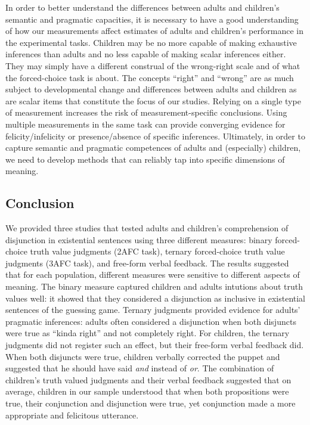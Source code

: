 \documentclass[floatsintext,man]{apa6}
\theoremstyle{definition}
\theoremstyle{definition}
\theoremstyle{definition}
\theoremstyle{remark}
\begin{document}
In order to better understand the differences between adults and
children's semantic and pragmatic capacities, it is necessary to have a
good understanding of how our measurements affect estimates of adults
and children's performance in the experimental tasks. Children may be no
more capable of making exhaustive inferences than adults and no less
capable of making scalar inferences either. They may simply have a
different construal of the wrong-right scale and of what the
forced-choice task is about. The concepts \enquote{right} and
\enquote{wrong} are as much subject to developmental change and
differences between adults and children as are scalar items that
constitute the focus of our studies. Relying on a single type of
measurement increases the risk of measurement-specific conclusions.
Using multiple measurements in the same task can provide converging
evidence for felicity/infelicity or presence/absence of specific
inferences. Ultimately, in order to capture semantic and pragmatic
competences of adults and (especially) children, we need to develop
methods that can reliably tap into specific dimensions of meaning.

\subsection{Conclusion}\label{conclusion}

We provided three studies that tested adults and children's
comprehension of disjunction in existential sentences using three
different measures: binary forced-choice truth value judgments (2AFC
task), ternary forced-choice truth value judgments (3AFC task), and
free-form verbal feedback. The results suggested that for each
population, different measures were sensitive to different aspects of
meaning. The binary measure captured children and adults intutions about
truth values well: it showed that they considered a disjunction as
inclusive in existential sentences of the guessing game. Ternary
judgments provided evidence for adults' pragmatic inferences: adults
often considered a disjunction when both disjuncts were true as
\enquote{kinda right} and not completely right. For children, the
ternary judgments did not register such an effect, but their free-form
verbal feedback did. When both disjuncts were true, children verbally
corrected the puppet and suggested that he should have said \emph{and}
instead of \emph{or}. The combination of children's truth valued
judgments and their verbal feedback suggested that on average, children
in our sample understood that when both propositions were true, their
conjunction and disjunction were true, yet conjunction made a more
appropriate and felicitous utterance.
\end{document}
